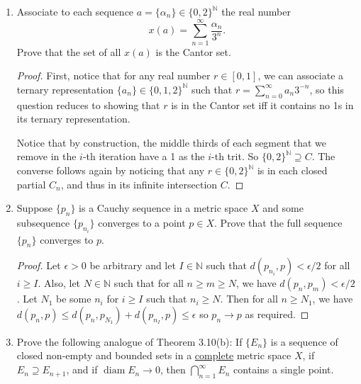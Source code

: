 \documentclass{scrbook}
\newcommand{\N}{\mathbb{N}}
\renewcommand{\to}{\rightarrow}
\renewcommand{\underline}{\ul}
\DeclareMathOperator{\diam}{diam}
\begin{document}
\begin{enumerate}
\begin{proof}
    Notice that according to the definition, we must have $x_{n+1} \ge \sqrt[p]{\alpha}$ by the AM-GM inequality. Then let $x_1 > \sqrt[p]{\alpha}$ without loss of generality, then by a similar argument as above, $x_{n+1} < x_n$ so the sequence converges since it is monotonically decreasing and bounded below. It must converge to its unique fixed point at least $\sqrt[p]{\alpha}$, namely $x_n \to \sqrt[p]{\alpha}$.
\end{proof}

\item %
Associate to each sequence $a = \{\alpha_n\} \in \{0, 2\}^{\N}$ the real number
\[
	x(a) = \sum_{n=1}^{\infty} \frac{\alpha_n}{3^n}.
\]
Prove that the set of all $x(a)$ is the Cantor set.

\begin{proof}
    First, notice that for any real number $r \in [0, 1]$, we can associate a ternary representation $\{a_n\} \in \{0, 1, 2\}^{\N}$ such that $r = \sum_{n=0}^{\infty} a_n 3^{-n}$, so this question reduces to showing that $r$ is in the Cantor set iff it contains no 1s in its ternary representation.

    Notice that by construction, the middle thirds of each segment that we remove in the $i$-th iteration have a 1 as the $i$-th trit. So $\{0, 2\}^{\N} \supseteq C$. The converse follows again by noticing that any $r \in \{0, 2\}^{\N}$ is in each closed partial $C_n$, and thus in its infinite intersection $C$.
\end{proof}

\item %
Suppose $\{p_n\}$ is a Cauchy sequence in a metric space $X$ and some subsequence $\{p_{n_i}\}$ converges to a point $p \in X$. Prove that the full sequence $\{p_n\}$ converges to $p$.

\begin{proof}
    Let $\epsilon > 0$ be arbitrary and let $I \in \N$ such that $d(p_{n_i}, p) < \epsilon / 2$ for all $i \ge I$. Also, let $N \in \N$ such that for all $n \ge m \ge N$, we have $d(p_n, p_m) < \epsilon / 2$. Let $N_1$ be some $n_i$ for $i \ge I$ such that $n_i \ge N$. Then for all $n \ge N_1$, we have $d(p_n, p) \le d(p_n, p_{N_1}) + d(p_{n_I}, p) \le \epsilon$ so $p_n \to p$ as required.
\end{proof}

\item %
Prove the following analogue of Theorem 3.10(b): If $\{E_n\}$ is a sequence of closed non-empty and bounded sets in a \underline{complete} metric space $X$, if $E_n \supseteq E_{n+1}$, and if $\diam E_n \to 0$, then $\bigcap_{n=1}^{\infty} E_n$ contains a single point.


\end{enumerate}
\end{document}
